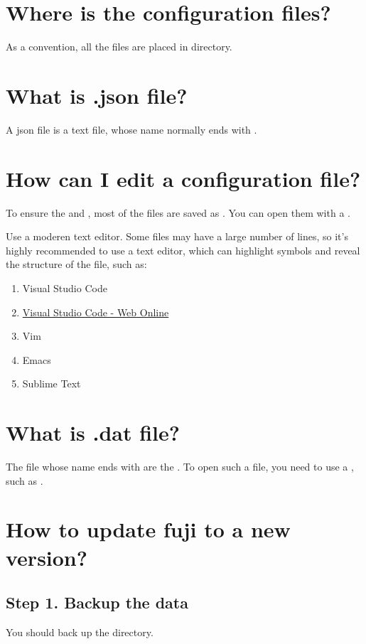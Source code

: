 \section{Where is the configuration files?}
As a convention, all the files are placed in  directory.


\section{What is .json file?}
A json file is a text file, whose name normally ends with .


\section{How can I edit a configuration file?}
To ensure the  and , most of the files are saved as .
You can open them with a .

\begin{tips}{Use a moderen text editor.}
    Some files may have a large number of lines, so it's highly recommended to use a  text editor, which can highlight symbols and reveal the structure of the file, such as:
    \begin{enumerate}
        \item Visual Studio Code
        \item \href{https://vscode.dev/}{Visual Studio Code - Web Online}
        \item Vim
        \item Emacs
        \item Sublime Text
    \end{enumerate}
\end{tips}


\section{What is .dat file?}
The file whose name ends with  are the .
To open such a file, you need to use a , such as .


\section{How to update fuji to a new version?}

\subsection{Step 1. Backup the data}
You should back up the  directory.

